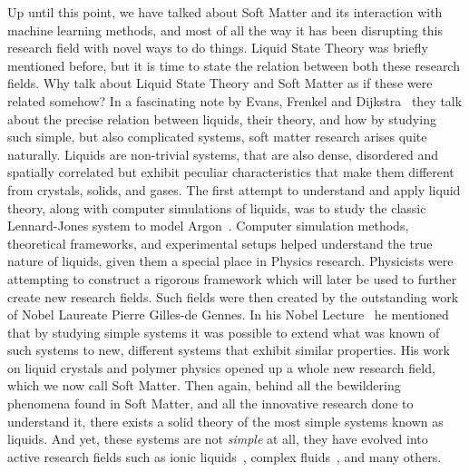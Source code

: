 Up until this point, we have talked about Soft Matter and its interaction with machine
learning methods, and most of all the way it has been disrupting this research field
with novel ways to do things. Liquid State Theory was briefly mentioned before,
but it is time to state the relation between both these research fields.
Why talk about Liquid State Theory and Soft Matter as if these were related somehow?
In a fascinating note by Evans, Frenkel and Dijkstra~\cite{evansSimpleLiquidsColloids2019}
they talk about the precise relation between liquids, their theory, and how by studying
such simple, but also complicated systems, soft matter research arises quite naturally.
Liquids are non-trivial systems, that are also dense, disordered and spatially correlated
but exhibit peculiar characteristics that make them different from crystals, solids,
and gases. The first attempt to understand and apply liquid theory,
along with computer simulations of liquids, was to study the
classic Lennard-Jones system to model Argon~\cite{mcdonaldCalculationThermodynamicProperties1967,verletComputerExperimentsClassical1967a}. 
Computer simulation methods, theoretical frameworks, and experimental setups helped 
understand the true nature of liquids, given them a special place in Physics research. 
Physicists were attempting to construct a rigorous framework which will later be used to 
further create new research fields.
Such fields were then created by the outstanding work of Nobel Laureate Pierre Gilles-de 
Gennes. In his Nobel Lecture~\cite{degennesSoftMatter1992} he mentioned that by studying 
simple systems it was possible to extend what was known of such systems to new, different 
systems that exhibit similar properties. His work on liquid crystals and polymer physics 
opened up a whole new research field, which we now call Soft Matter.
Then again, behind all the bewildering phenomena found in Soft Matter, and all the 
innovative research done to understand it, there exists a solid theory of the most simple 
systems known as liquids. And yet, these systems are not \emph{simple} at all, they
have evolved into active research fields such as ionic liquids~\cite{rogersIonicLiquidsSolvents2003}, complex fluids~\cite{gelbartNewScienceComplex1996},
and many others.

